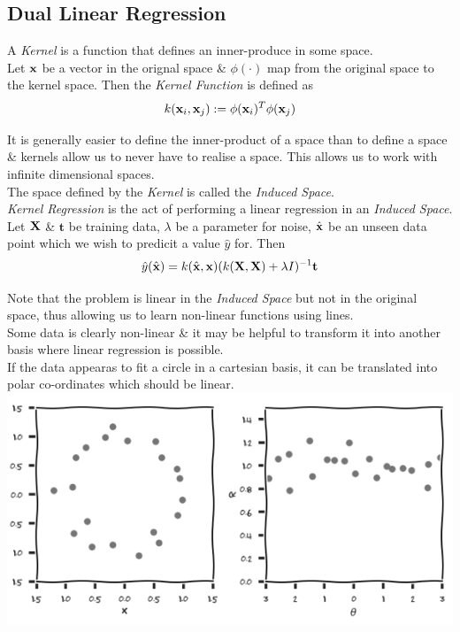 \documentclass[11pt,a4paper]{article}
\begin{document}
\subsection{Dual Linear Regression}

A \textit{Kernel} is a function that defines an inner-produce in some space.\\
Let $\textbf{x}$ be a vector in the orignal space \& $\phi(\cdot)$ map from the original space to the kernel space. Then the \textit{Kernel Function} is defined as
$$k(\textbf{x}_i,\textbf{x}_j):=\phi(\textbf{x}_i)^T\phi(\textbf{x}_j)$$

It is generally easier to define the inner-product of a space than to define a space \& kernels allow us to never have to realise a space. This allows us to work with infinite dimensional spaces.\\
\nb The space defined by the \textit{Kernel} is called the \textit{Induced Space}.\\

\textit{Kernel Regression} is the act of performing a linear regression in an \textit{Induced Space}.\\
Let $\textbf{X}$ \& $\textbf{t}$ be  training data, $\lambda$ be a parameter for noise, $\hat{\textbf{x}}$ be an unseen data point which we wish to predicit a value $\hat{y}$ for. Then
$$\hat{y}(\hat{\textbf{x}})=k(\hat{\textbf{x}},\textbf{x})(k(\textbf{X},\textbf{X})+\lambda I)^{-1}\textbf{t}$$

Note that the problem is linear in the \textit{Induced Space} but not in the original space, thus allowing us to learn non-linear functions using lines.\\


Some data is clearly non-linear \& it may be helpful to transform it into another basis where linear regression is possible.\\
\eg If the data appearas to fit a circle in a cartesian basis, it can be translated into polar co-ordinates which should be linear.\\
\includegraphics[scale=.4]{img/changeBasis.png}
\end{document}
